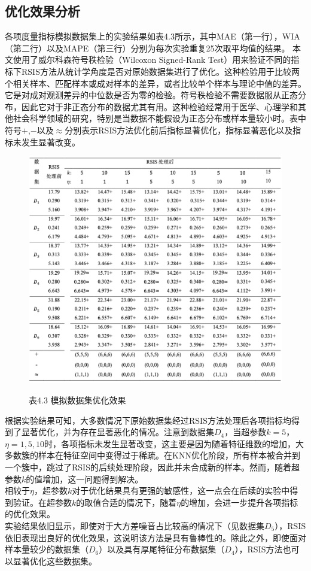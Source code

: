 \documentclass{NauThesis}
\begin{document}
\subsection{优化效果分析}
各项度量指标模拟数据集上的实验结果如表4.3所示，其中MAE（第一行），WIA（第二行）以及MAPE（第三行）分别为每次实验重复25次取平均值的结果。
本文使用了威尔科森符号秩检验（Wilcoxon Signed-Rank Test）用来验证不同的指标下RSIS方法从统计学角度是否对原始数据集进行了优化\cite{ref82}。这种检验用于比较两个相关样本、匹配样本或成对样本的差异，或者比较单个样本与理论中值的差异。它是对成对观测差异的中位数是否为零的检验。符号秩检验不需要数据服从正态分布，因此它对于非正态分布的数据尤其有用。这种检验经常用于医学、心理学和其他社会科学领域的研究，特别是当数据不能假设为正态分布或样本量较小时。表中符号$+$,$-$以及$\approx$分别表示RSIS方法优化前后指标显著优化，指标显著恶化以及指标未发生显著改变。
\\
\begin{figure}[htbp]
    \centering
    \caption*{表4.3 模拟数据集优化效果}
    \includegraphics[width=1.0\textwidth]{figs/tab3.png}
    \label{tab3}
\end{figure}

根据实验结果可知，大多数情况下原始数据集经过RSIS方法处理后各项指标均得到了显著优化，并为存在显著恶化的情况。注意到数据集$D_4$，当超参数$k=5$，$\eta=1,5,10$时，各项指标未发生显著改变，这主要是因为随着特征维数的增加，大多数簇的样本在特征空间中变得过于稀疏。在KNN优化阶段，所有样本被合并到一个簇中，跳过了RSIS的后续处理阶段，因此并未合成新的样本。然而，随着超参数$k$的值增加，这一问题得到解决。
\\\hspace*{2em}相较于$\eta$，超参数$k$对于优化结果具有更强的敏感性，这一点会在后续的实验中得到验证。在超参数$k$的取值合适的情况下，随着$\eta$的增加，会进一步提升各项指标的优化效果。
\\\hspace*{2em}实验结果依旧显示，即使对于大方差噪音占比较高的情况下（见数据集$D_5$），RSIS依旧表现出良好的优化效果，这说明该方法是具有鲁棒性的。除此之外，即使面对样本量较少的数据集（$D_6$）以及具有厚尾特征分布数据集（$D_4$），RSIS方法也可以显著优化这些数据集。
\end{document}

